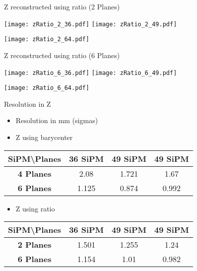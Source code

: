 \documentclass{beamer}
\begin{document}
\begin{frame}{Z reconstructed using ratio (2 Planes)}
\begin{adjustwidth}{-1.5em}{-1.5em}
	\texttt{[image: zRatio\_2\_36.pdf]}
	\texttt{[image: zRatio\_2\_49.pdf]} \\
	\begin{center} {\texttt{[image: zRatio\_2\_64.pdf]}} \end{center}
\end{adjustwidth}
\end{frame}


\begin{frame}{Z reconstructed using ratio (6 Planes)}
\begin{adjustwidth}{-1.5em}{-1.5em}
	\texttt{[image: zRatio\_6\_36.pdf]}
	\texttt{[image: zRatio\_6\_49.pdf]} \\
	\begin{center} {\texttt{[image: zRatio\_6\_64.pdf]}} \end{center}
\end{adjustwidth}
\end{frame}

\begin{frame}{Resolution in Z}
\begin{center}
\begin{itemize}
\item Resolution in mm (sigmas)
\item Z using barycenter
\vspace{0.5 cm}
\end{itemize}
 \begin{tabular}{c|ccc|}
  \toprule
  SiPM\textbackslash Planes & \textbf{36 SiPM} & \textbf{49 SiPM} & \textbf{49 SiPM} \\
   \hline
  \textbf{4 Planes} & 2.08 & 1.721 & 1.67 \\
  \textbf{6 Planes} & 1.125 & 0.874 & 0.992 \\
    \toprule
 \end{tabular}
 
 \begin{itemize}
 \item Z using ratio
 \vspace{0.5 cm}
 \end{itemize}
 
 \begin{tabular}{c|ccc|}
  \toprule
  SiPM\textbackslash Planes & \textbf{36 SiPM} & \textbf{49 SiPM} & \textbf{49 SiPM} \\
   \hline
  \textbf{2 Planes} & 1.501 & 1.255 & 1.24 \\
  \textbf{6 Planes} & 1.154 & 1.01 & 0.982 \\
    \toprule
 \end{tabular}
\end{center}
\end{frame}
\end{document}
